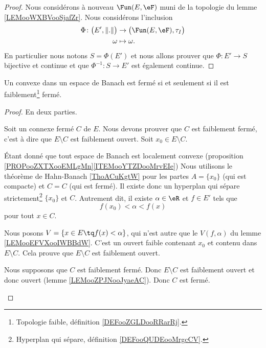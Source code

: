 \begin{proof}
	Nous considérons à nouveau \( \Fun(E, \eF)\) muni de la topologie du lemme \ref{LEMooWXBVooSjafZr}. Nous considérons l'inclusion
	\begin{equation}
		\begin{aligned}
			\Phi\colon \big( E',\| . \| \big) & \to \big( \Fun(E,\eF), \tau_I \big) \\
			\omega                            & \mapsto \omega.
		\end{aligned}
	\end{equation}
	En particulier nous notons \( S=\Phi(E')\) et nous allons prouver que \( \Phi\colon E'\to S\) bijective et continue et que \( \Phi^{-1}\colon S\to E'\) est également continue.
\end{proof}


\begin{proposition}       \label{PROPooYARHooOpmztY}
	Un convexe dans un espace de Banach est fermé si et seulement si il est faiblement\footnote{Topologie faible, définition \ref{DEFooZGLDooRRarRj}.} fermé.
\end{proposition}

\begin{proof}
	En deux parties.
	\begin{subproof}
		\spitem[\( \Rightarrow\)]
		Soit un connexe fermé \( C\) de \( E\). Nous devons prouver que \( C\) est faiblement fermé, c'est à dire que \( E\setminus C\) est faiblement ouvert. Soit \( x_0\in E\setminus C\).

		Étant donné que tout espace de Banach est localement convexe (proposition \ref{PROPooZXTXooEMLgMn}\ref{ITEMooYTZDooMrvEIe}) Nous utilisons le théorème de Hahn-Banach \ref{ThoACuKgtW} pour les partes \( A=\{ x_0 \}\) (qui est compacte) et \( C=C\) (qui est fermé). Il existe donc un hyperplan qui sépare strictement\footnote{Hyperplan qui sépare, définition \ref{DEFooQUDEooMrgcCV}.} \( \{ x_0 \}\) et \( C\). Autrement dit, il existe \( \alpha\in \eR\) et \( f\in E'\) tels que
		\begin{equation}
			f(x_0)<\alpha<f(x)
		\end{equation}
		pour tout \( x\in C\).

		Nous posons \( V=\{ x\in E\tq f(x)<\alpha \}\), qui n'est autre que le \( V(f,\alpha)\) du lemme \ref{LEMooEFVXooIWBBdW}. C'est un ouvert faible contenant \( x_0\) et contenu dans \( E\setminus C\). Cela prouve que \( E\setminus C\) est faiblement ouvert.

		\spitem[\( \Leftarrow\)]
		Nous supposons que \( C\) est faiblement fermé. Donc \( E\setminus C\) est faiblement ouvert et donc ouvert (lemme \ref{LEMooZPJNooJyaeAC}). Donc \( C\) est fermé.
	\end{subproof}
\end{proof}


